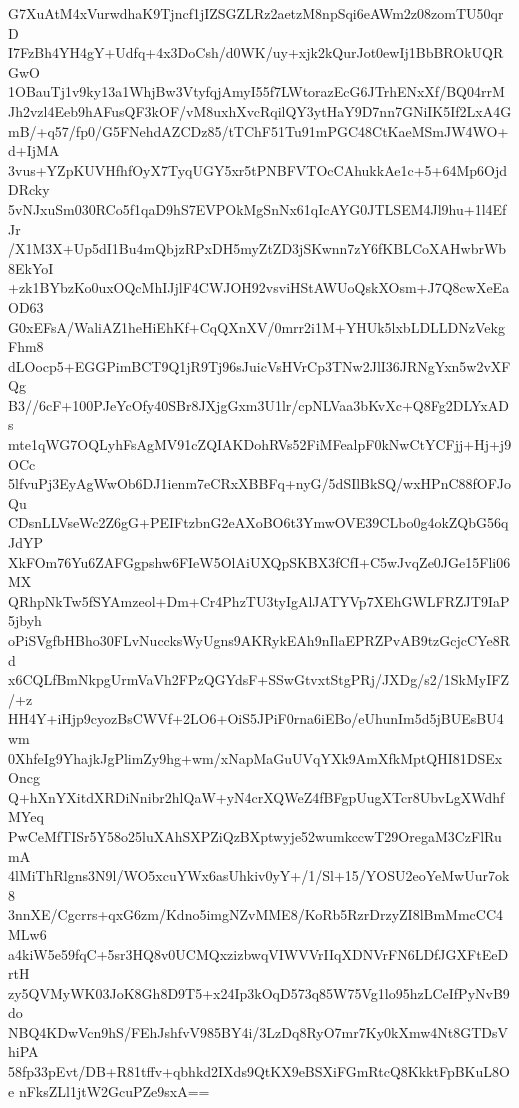 G7XuAtM4xVurwdhaK9Tjncf1jIZSGZLRz2aetzM8npSqi6eAWm2z08zomTU50qrD
I7FzBh4YH4gY+Udfq+4x3DoCsh/d0WK/uy+xjk2kQurJot0ewIj1BbBROkUQRGwO
1OBauTj1v9ky13a1WhjBw3VtyfqjAmyI55f7LWtorazEcG6JTrhENxXf/BQ04rrM
Jh2vzl4Eeb9hAFusQF3kOF/vM8uxhXvcRqilQY3ytHaY9D7nn7GNiIK5If2LxA4G
mB/+q57/fp0/G5FNehdAZCDz85/tTChF51Tu91mPGC48CtKaeMSmJW4WO+d+IjMA
3vus+YZpKUVHfhfOyX7TyqUGY5xr5tPNBFVTOcCAhukkAe1c+5+64Mp6OjdDRcky
5vNJxuSm030RCo5f1qaD9hS7EVPOkMgSnNx61qIcAYG0JTLSEM4Jl9hu+1l4EfJr
/X1M3X+Up5dI1Bu4mQbjzRPxDH5myZtZD3jSKwnn7zY6fKBLCoXAHwbrWb8EkYoI
+zk1BYbzKo0uxOQcMhIJjlF4CWJOH92vsviHStAWUoQskXOsm+J7Q8cwXeEaOD63
G0xEFsA/WaliAZ1heHiEhKf+CqQXnXV/0mrr2i1M+YHUk5lxbLDLLDNzVekgFhm8
dLOocp5+EGGPimBCT9Q1jR9Tj96sJuicVsHVrCp3TNw2JlI36JRNgYxn5w2vXFQg
B3//6cF+100PJeYcOfy40SBr8JXjgGxm3U1lr/cpNLVaa3bKvXc+Q8Fg2DLYxADs
mte1qWG7OQLyhFsAgMV91cZQIAKDohRVs52FiMFealpF0kNwCtYCFjj+Hj+j9OCc
5lfvuPj3EyAgWwOb6DJ1ienm7eCRxXBBFq+nyG/5dSIlBkSQ/wxHPnC88fOFJoQu
CDsnLLVseWc2Z6gG+PEIFtzbnG2eAXoBO6t3YmwOVE39CLbo0g4okZQbG56qJdYP
XkFOm76Yu6ZAFGgpshw6FIeW5OlAiUXQpSKBX3fCfI+C5wJvqZe0JGe15Fli06MX
QRhpNkTw5fSYAmzeol+Dm+Cr4PhzTU3tyIgAlJATYVp7XEhGWLFRZJT9IaP5jbyh
oPiSVgfbHBho30FLvNuccksWyUgns9AKRykEAh9nIlaEPRZPvAB9tzGcjcCYe8Rd
x6CQLfBmNkpgUrmVaVh2FPzQGYdsF+SSwGtvxtStgPRj/JXDg/s2/1SkMyIFZ/+z
HH4Y+iHjp9cyozBsCWVf+2LO6+OiS5JPiF0rna6iEBo/eUhunIm5d5jBUEsBU4wm
0XhfeIg9YhajkJgPlimZy9hg+wm/xNapMaGuUVqYXk9AmXfkMptQHI81DSExOncg
Q+hXnYXitdXRDiNnibr2hlQaW+yN4crXQWeZ4fBFgpUugXTcr8UbvLgXWdhfMYeq
PwCeMfTISr5Y58o25luXAhSXPZiQzBXptwyje52wumkccwT29OregaM3CzFlRumA
4lMiThRlgns3N9l/WO5xcuYWx6asUhkiv0yY+/1/Sl+15/YOSU2eoYeMwUur7ok8
3nnXE/Cgcrrs+qxG6zm/Kdno5imgNZvMME8/KoRb5RzrDrzyZI8lBmMmcCC4MLw6
a4kiW5e59fqC+5sr3HQ8v0UCMQxzizbwqVIWVVrIIqXDNVrFN6LDfJGXFtEeDrtH
zy5QVMyWK03JoK8Gh8D9T5+x24Ip3kOqD573q85W75Vg1lo95hzLCeIfPyNvB9do
NBQ4KDwVcn9hS/FEhJshfvV985BY4i/3LzDq8RyO7mr7Ky0kXmw4Nt8GTDsVhiPA
58fp33pEvt/DB+R81tffv+qbhkd2IXds9QtKX9eBSXiFGmRtcQ8KkktFpBKuL8Oe
nFksZLl1jtW2GcuPZe9sxA==
